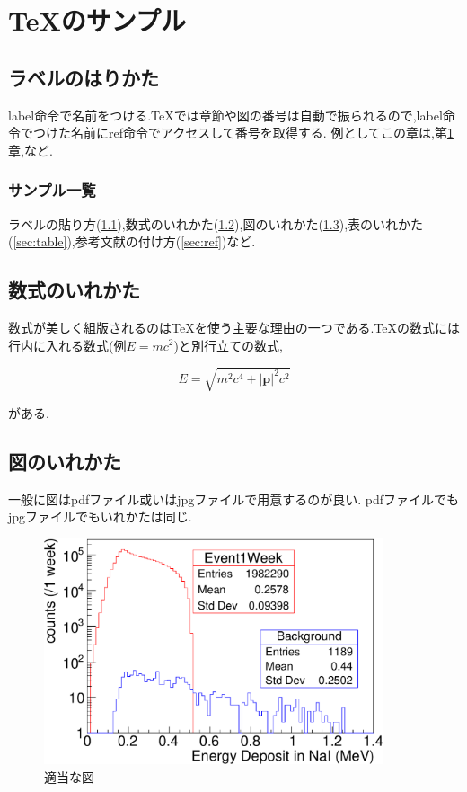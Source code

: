 \chapter{\TeX のサンプル}\label{sample}

\section{ラベルのはりかた}\label{sec:label}
label命令で名前をつける.\TeX では章節や図の番号は自動で振られるので,label命令でつけた名前にref命令でアクセスして番号を取得する.
例としてこの章は,第\ref{sample}章,など.

\subsection{サンプル一覧}\label{sec:list}
ラベルの貼り方(\ref{sec:label}),数式のいれかた(\ref{sec:eq}),図のいれかた(\ref{sec:figure}),表のいれかた(\ref{sec:table}),参考文献の付け方(\ref{sec:ref})など.

\section{数式のいれかた}\label{sec:eq}
数式が美しく組版されるのは\TeX を使う主要な理由の一つである.\TeX の数式には行内に入れる数式(例$E=mc^2$)と別行立ての数式,

\begin{equation}
	\label{eq:test1}
	E = \sqrt{m^2 c^4 +|\bm{p}|^2 c^2}
\end{equation}

がある.

\section{図のいれかた}\label{sec:figure}

一般に図はpdfファイル或いはjpgファイルで用意するのが良い.
pdfファイルでもjpgファイルでもいれかたは同じ.


\begin{figure}[tbp]
	\centering
	\includegraphics[width=10cm]{fig/figure.pdf}
	\caption{適当な図}
	\label{fig:test1}
\end{figure}

